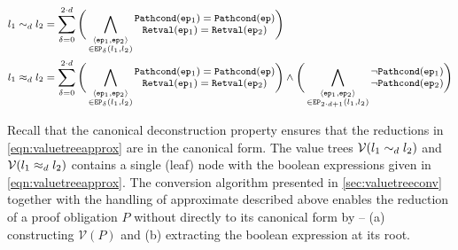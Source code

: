 \begin{equation}
\label{eqn:valuetreeapprox}
\begin{footnotesize}
\begin{aligned}
l_1 \indEqDepth{d} l_2 &= \sum_{\delta=0}^{2 \cdot d} \Bigg( \bigwedge_{\substack{\langle \execpath{}_1, \execpath{}_2 \rangle \\ \in \execpaths{\delta}{l_1}{l_2}}} \begin{array}{@{}c@{}} \pathcond{\execpath{}_1} = \pathcond{\execpath{}} \\ \retval{\execpath{}_1} = \retval{\execpath{}_2} \end{array} \Bigg) \\
l_1 \indEqUapprox{d} l_2 &= \sum_{\delta=0}^{2 \cdot d} \Bigg( \bigwedge_{\substack{\langle \execpath{}_1, \execpath{}_2 \rangle \\ \in \execpaths{\delta}{l_1}{l_2}}} \begin{array}{@{}c@{}} \pathcond{\execpath{}_1} = \pathcond{\execpath{}} \\ \retval{\execpath{}_1} = \retval{\execpath{}_2} \end{array} \Bigg) \land \Bigg( \bigwedge_{\substack{\langle \execpath{}_1, \execpath{}_2 \rangle \\ \in \execpaths{2 \cdot d + 1}{l_1}{l_2}}} \begin{array}{@{}c@{}} \neg \pathcond{\execpath{}_1} \\ \neg \pathcond{\execpath{}_2} \end{array} \Bigg)
\end{aligned}
\end{footnotesize}
\end{equation}

Recall that the canonical deconstruction property ensures that the reductions in \cref{eqn:valuetreeapprox} are in the canonical form.
The value trees $\mathcal{V}(l_1 \sim_{d} l_2)$ and $\mathcal{V}(l_1 \approx_{d} l_2)$ contains a single (leaf) node with the boolean
expressions given in \cref{eqn:valuetreeapprox}.
The conversion algorithm presented in \cref{sec:valuetreeconv} together with the handling of approximate \recursiveRelations{} described above
enables the reduction of a proof obligation $P$ without \recursiveRelations{} directly to its canonical form by --
(a) constructing $\mathcal{V}(P)$ and (b) extracting the boolean expression at its root.

